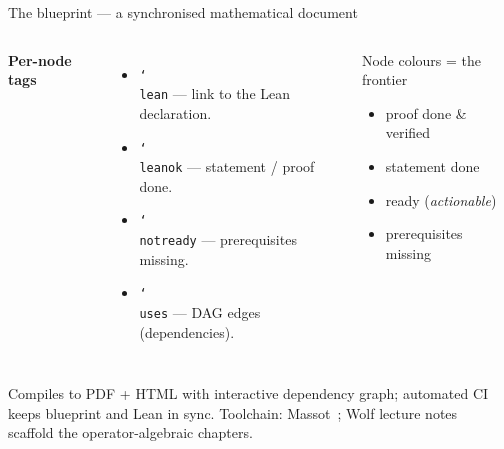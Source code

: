 \documentclass[aspectratio=169,10pt]{beamer}
\begin{document}
\begin{frame}{The blueprint --- a synchronised mathematical document}
    \begin{columns}[T]
        \textbf{Per-node tags}
        \begin{itemize}
            \footnotesize
            \item \texttt{\char`\\lean} --- link to the Lean declaration.
            \item \texttt{\char`\\leanok} --- statement / proof done.
            \item \texttt{\char`\\notready} --- prerequisites missing.
            \item \texttt{\char`\\uses} --- DAG edges (dependencies).
        \end{itemize}
        \begin{block}{Node colours = the frontier}
            \footnotesize
            \begin{itemize}
                \item[\textcolor{leangreen}{$\blacksquare$}] proof done \& verified
                \item[\textcolor{mintgreen}{$\blacksquare$}] statement done
                \item[\textcolor{leanblue}{$\blacksquare$}] ready (\emph{actionable})
                \item[\textcolor{amber}{$\blacksquare$}] prerequisites missing
            \end{itemize}
        \end{block}
    \end{columns}
    \vspace{0.4em}
    \textcolor{dimwhite}{\footnotesize Compiles to PDF + HTML with interactive dependency graph; automated CI keeps blueprint and Lean in sync. Toolchain: Massot~\cite{Massot2021Leanblueprint}; Wolf lecture notes~\cite{Wolf2012Quantum} scaffold the operator-algebraic chapters.}
\end{frame}
\end{document}
